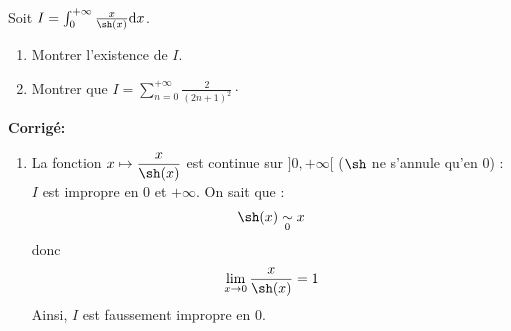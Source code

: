 \documentclass[a4paper,twoside,french,10pt]{VcCours}
\newcommand{\dx}{\text{d}x}
\newcommand{\corr}{\textbf{Corrigé:}}
\begin{document}
\begin{Exercice}{}\label{gamma} Soit $I = \int_{0}^{+ \infty} \frac{x}{\sh(x)} \dx$.

\begin{enumerate}
\item Montrer l'existence de $I$.
\item Montrer que $I= \sum_{n=0}^{+ \infty} \frac{2}{(2n+1)^2}\cdot$
\end{enumerate}
\end{Exercice} 

\corr 

\begin{enumerate}
\item La fonction $x \mapsto \dfrac{x}{\sh(x)}$ est continue sur $]0, + \infty[$ ($\sh$ ne s'annule qu'en $0$) : $I$ est impropre en $0$ et $+ \infty$. On sait que :
$$ \sh(x) \underset{0}{\sim} x$$
donc 
$$ \lim_{x \rightarrow 0} \dfrac{x}{\sh(x)} = 1$$
Ainsi, $I$ est faussement impropre en $0$. 

\medskip


\end{enumerate}
\end{document}
